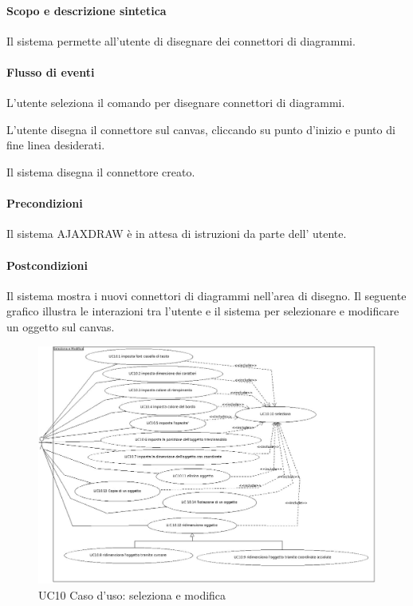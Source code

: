 \paragraph{Scopo e descrizione sintetica} 
Il sistema permette all'utente di disegnare dei connettori di diagrammi.
\paragraph{Flusso di eventi}
\begin{elenconumerato}[\textbf{}]{\subsubsecindent}
\item L'utente seleziona il comando per disegnare connettori di diagrammi.
\item L'utente disegna il connettore sul canvas, cliccando su punto d'inizio e punto di fine linea desiderati.
\item Il sistema disegna il connettore creato.
\end{elenconumerato}
\paragraph{Precondizioni} Il sistema AJAXDRAW \`e in attesa di istruzioni da parte dell' utente.
\paragraph{Postcondizioni} Il sistema mostra i nuovi connettori di diagrammi nell'area di disegno.
\newpage
{}
\label{ucselezionaemodifica}
Il seguente grafico illustra le interazioni tra l'utente e il sistema per selezionare e modificare un oggetto sul canvas.

\begin{figure}[!ht]
\centering
\vspace{20pt} 
\includegraphics{UC10Espanso.jpg}
\caption{UC10 Caso d'uso: seleziona e modifica}
\label{uc10}
\end{figure}
\newpage
{}
